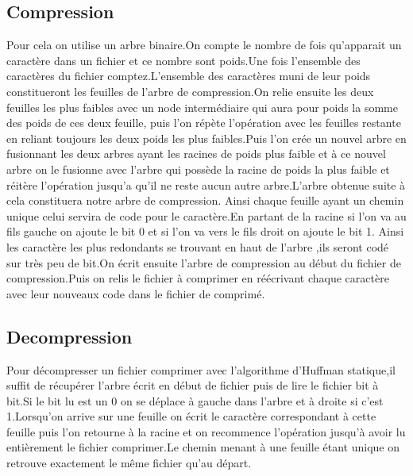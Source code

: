 \documentclass{report}
\begin{document}
\subsection*{Compression}
Pour cela on utilise un arbre binaire.On compte le nombre de fois qu'apparait un caractère dans un fichier et ce nombre sont poids.Une fois l'ensemble des caractères du fichier comptez.L'ensemble des caractères muni de leur poids constitueront les feuilles de l'arbre de compression.On relie ensuite les deux feuilles les plus faibles avec un node intermédiaire qui aura pour poids la somme des poids de ces deux feuille, puis l'on répète l'opération avec les feuilles restante en reliant toujours les deux poids les plus faibles.Puis l'on crée un nouvel arbre en fusionnant les deux arbres ayant les racines de poids plus faible et à ce nouvel arbre on le fusionne avec l'arbre qui possède la racine de poids la plus faible et réitère l'opération jusqu'a qu'il ne reste aucun autre arbre.L'arbre obtenue suite à cela constituera notre arbre de compression. Ainsi chaque feuille ayant un chemin unique celui servira de code pour le caractère.En partant de la racine si l'on va au fils gauche on ajoute le bit 0 et si l'on va vers le fils droit on ajoute le bit 1. Ainsi les caractère les plus redondants se trouvant en haut de l'arbre ,ils seront codé sur très peu de bit.On écrit ensuite l'arbre de compression au début du fichier de compression.Puis on relis le fichier à comprimer en réécrivant chaque caractère avec leur nouveaux code dans le fichier de comprimé.
\subsection*{Decompression}
Pour décompresser un fichier comprimer avec l'algorithme d'Huffman statique,il suffit de récupérer l'arbre écrit en début de fichier puis de lire le fichier bit à bit.Si le bit lu est un 0 on se déplace à gauche dans l'arbre et à droite si c'est 1.Lorsqu'on arrive sur une feuille on écrit le caractère correspondant à cette feuille puis l'on retourne à la racine et on recommence l'opération jusqu'à avoir lu entièrement le fichier comprimer.Le chemin menant à une feuille étant unique on retrouve exactement le même fichier qu'au départ.
\end{document}
